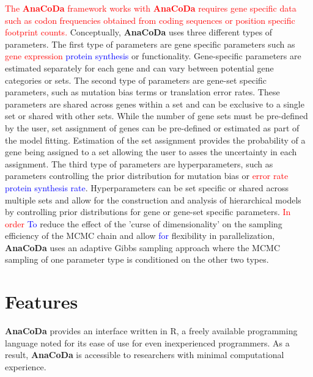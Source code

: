 \documentclass{bioinfo}
\newcommand{\package}{\textbf{AnaCoDa }} %
\begin{document}
\textcolor{red}{The \package framework works with \package requires gene specific data such as codon frequencies obtained from coding sequences or position specific footprint counts.}
Conceptually, \package uses three different types of parameters.
The first type of parameters are gene specific parameters such as \textcolor{red}{gene expression} \textcolor{blue}{protein synthesis} or functionality.
Gene-specific parameters are estimated separately for each gene and can vary between potential gene categories or sets.
The second type of parameters are gene-set specific parameters, such as mutation bias terms or translation error rates.
These parameters are shared across genes within a set and can be exclusive to a single set or shared with other sets.
While the number of gene sets must be pre-defined by the user, set assignment of genes can be pre-defined or estimated as part of the model fitting.
Estimation of the set assignment provides the probability of a gene being assigned to a set allowing the user to asses the uncertainty in each assignment.
The third type of parameters are hyperparameters, such as parameters controlling the prior distribution for mutation bias or \textcolor{red}{error rate} \textcolor{blue}{protein synthesis rate}.
Hyperparameters can be set specific or shared across multiple sets and allow for the construction and analysis of hierarchical models by controlling prior distributions for gene or gene-set specific parameters.
\textcolor{red}{In order} \textcolor{blue}{To} reduce the effect of the 'curse of dimensionality' on the sampling efficiency of the MCMC chain and allow \textcolor{blue}{for} flexibility in parallelization, \package uses an adaptive Gibbs sampling approach where the MCMC sampling of one parameter type is conditioned on the other two types.

\section*{Features}
\package provides an interface written in R, a freely available programming language noted for its ease of use for even inexperienced programmers. 
As a result, \package is accessible to researchers with minimal computational experience. 
\end{document}
